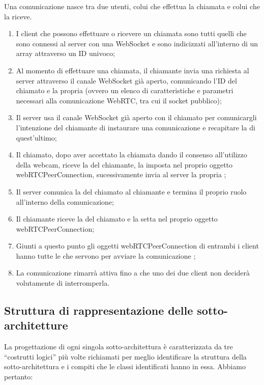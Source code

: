 Una comunicazione nasce tra due utenti, colui che effettua la chiamata e colui che la riceve.
\begin{enumerate}
\item I client che possono effettuare o ricevere un chiamata sono tutti quelli che sono connessi al server con una WebSocket e sono indicizzati all'interno di un array attraverso un ID univoco;
\item Al momento di effettuare una chiamata, il chiamante invia una richiesta al server attraverso il canale WebSocket già aperto, comunicando l'ID del chiamato e la propria  (ovvero un elenco di caratteristiche e parametri necessari alla comunicazione WebRTC, tra cui il socket pubblico);
\item Il server usa il canale WebSocket già aperto con il chiamato per comunicargli l'intenzione del chiamante di instaurare una comunicazione e recapitare la  di quest'ultimo;
\item Il chiamato, dopo aver accettato la chiamata dando il consenso all'utilizzo della webcam, riceve la  del chiamante, la imposta nel proprio oggetto webRTCPeerConnection, sucessivamente invia al server la propria ;
\item Il server comunica la  del chiamato al chiamante e termina il proprio ruolo all'interno della comunicazione;
\item Il chiamante riceve la  del chiamato e la setta nel proprio oggetto webRTCPeerConnection;
\item Giunti a questo punto gli oggetti webRTCPeerConnection di entrambi i client hanno tutte le  che servono per avviare la comunicazione ;
\item La comunicazione rimarrà attiva fino a che uno dei due client non deciderà volutamente di interromperla.
\end{enumerate}
\clearpage

\subsection{Struttura di rappresentazione delle sotto-architetture}

La progettazione di ogni singola sotto-architettura è caratterizzata da tre ``costrutti logici'' più volte richiamati per meglio identificare la struttura della sotto-architettura e i compiti che le classi identificati hanno in essa. Abbiamo pertanto:


